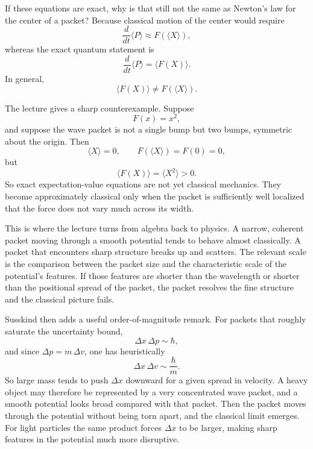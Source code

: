 If these equations are exact, why is that still not the same as Newton's law for the center of a packet? Because classical motion of the center would require
\begin{equation}
\frac{d}{dt}\langle P\rangle \approx F(\langle X\rangle),
\end{equation}
whereas the exact quantum statement is
\begin{equation}
\frac{d}{dt}\langle P\rangle = \langle F(X)\rangle.
\end{equation}
In general,
\begin{equation}
\langle F(X)\rangle \neq F(\langle X\rangle).
\end{equation}

The lecture gives a sharp counterexample. Suppose
\begin{equation}
F(x)=x^2,
\end{equation}
and suppose the wave packet is not a single bump but two bumps, symmetric about the origin. Then
\begin{equation}
\langle X\rangle=0,
\qquad
F(\langle X\rangle)=F(0)=0,
\end{equation}
but
\begin{equation}
\langle F(X)\rangle=\langle X^2\rangle>0.
\end{equation}
So exact expectation-value equations are not yet classical mechanics. They become approximately classical only when the packet is sufficiently well localized that the force does not vary much across its width.

This is where the lecture turns from algebra back to physics. A narrow, coherent packet moving through a smooth potential tends to behave almost classically. A packet that encounters sharp structure breaks up and scatters. The relevant scale is the comparison between the packet size and the characteristic scale of the potential's features. If those features are shorter than the wavelength or shorter than the positional spread of the packet, the packet resolves the fine structure and the classical picture fails.

Susskind then adds a useful order-of-magnitude remark. For packets that roughly saturate the uncertainty bound,
\begin{equation}
\Delta x\,\Delta p \sim \hbar,
\end{equation}
and since \(\Delta p=m\,\Delta v\), one has heuristically
\begin{equation}
\Delta x\,\Delta v \sim \frac{\hbar}{m}.
\end{equation}
So large mass tends to push \(\Delta x\) downward for a given spread in velocity. A heavy object may therefore be represented by a very concentrated wave packet, and a smooth potential looks broad compared with that packet. Then the packet moves through the potential without being torn apart, and the classical limit emerges. For light particles the same product forces \(\Delta x\) to be larger, making sharp features in the potential much more disruptive.

